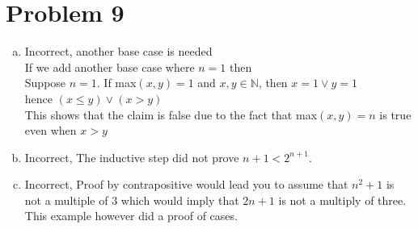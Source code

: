 \documentclass[11pt,letterpaper]{article}
\begin{document}
\section*{Problem 9}
\begin{enumerate}[(a)]
\item
Incorrect, another base case is needed\\
If we add another base case where $n=1$ then\\
Suppose $n=1$. If max$(x,y) =1$ and $x,y\in\mathbb{N}$, then $x=1 \vee y=1$ \\
hence $(x\leq y)\vee(x>y)$\\
This shows that the claim is false due to the fact that max$(x,y)=n$ is true even when $x>y$\\
\item
Incorrect, The inductive step did not prove $n+1<2^{n+1}$.
\item
Incorrect, Proof by contrapositive would lead you to assume that $n^2 + 1$ is not a multiple of 3 which would imply that $2n+1$ is not a multiply of three. This example however did a proof of cases.\\
\end{enumerate}
\end{document}
